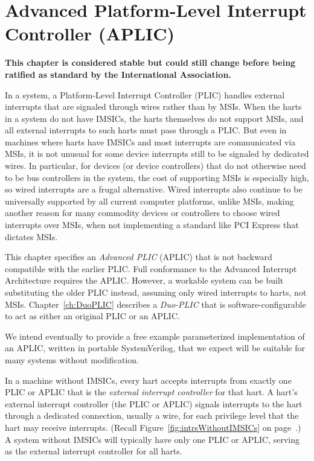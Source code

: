
\chapter{Advanced Platform-Level Interrupt Controller (APLIC)}
\label{ch:AdvPLIC}

\textbf{%
This chapter is considered stable but could still change before being
ratified as standard by the {\RISCV} International Association.%
}
\bigskip

In a {\RISCV} system, a Platform-Level Interrupt Controller (PLIC)
handles external interrupts that are signaled through wires rather than
by MSIs.
When the {\RISCV} harts in a system do not have IMSICs, the harts
themselves do not support MSIs, and all external interrupts to such
harts must pass through a PLIC.
But even in machines where harts have IMSICs and most interrupts are
communicated via MSIs, it is not unusual for some device interrupts
still to be signaled by dedicated wires.
In particular, for devices (or device controllers) that do not
otherwise need to be bus controllers in the system, the cost of supporting
MSIs is especially high, so wired interrupts are a frugal alternative.
Wired interrupts also continue to be universally supported by all
current computer platforms, unlike MSIs, making another reason for many
commodity devices or controllers to choose wired interrupts over MSIs,
when not implementing a standard like PCI Express that dictates MSIs.

This chapter specifies an \emph{Advanced PLIC} (APLIC) that is not backward
compatible with the earlier {\RISCV} PLIC.
Full conformance to the Advanced Interrupt Architecture requires the
APLIC.
However, a workable system can be built substituting the older PLIC
instead, assuming only wired interrupts to harts, not MSIs.
Chapter~\ref{ch:DuoPLIC} describes a \emph{\mbox{Duo-PLIC\/}} that is
software-configurable to act as either an original {\RISCV} PLIC or an
APLIC.

\begin{commentary}
We intend eventually to provide a free example parameterized
implementation of an APLIC, written in portable SystemVerilog,
that we expect will be suitable for many {\RISCV} systems without
modification.
\end{commentary}

In a machine without IMSICs, every {\RISCV} hart accepts interrupts
from exactly one PLIC or APLIC that is the \emph{external interrupt controller}
for that hart.
A hart's external interrupt controller (the PLIC or APLIC) signals interrupts
to the hart through a dedicated connection, usually a wire, for each
privilege level that the hart may receive interrupts.
(Recall Figure~\ref{fig:intrsWithoutIMSICs} on
page~\pageref{fig:intrsWithoutIMSICs}.)
A system without IMSICs will typically have only one PLIC or APLIC, serving as
the external interrupt controller for all {\RISCV} harts.

